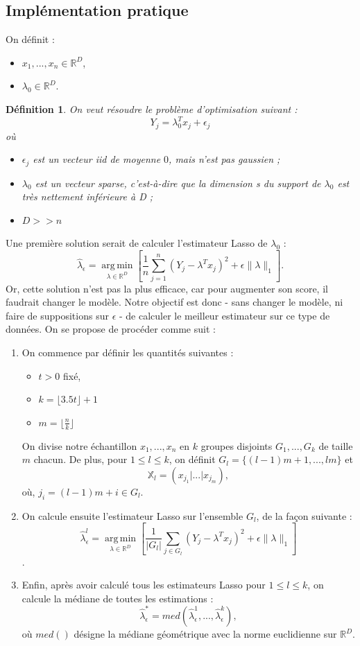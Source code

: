 \documentclass{article}
\DeclareMathOperator*{\argmin}{arg\,min}
\newtheorem{definition}{Définition}
\newcommand{\floor}[1]{\lfloor #1 \rfloor}
\begin{document}
\subsection{Implémentation pratique}
On définit : 
\begin{itemize}
    \item $x_1, ..., x_n \in \mathbb{R}^D$,
    \item $\lambda_0 \in \mathbb{R}^D$.
\end{itemize}
\begin{definition}
On veut résoudre le problème d'optimisation suivant : 
$$Y_j = \lambda_0^T x_j + \epsilon_j$$
où
\begin{itemize}
    \item $\epsilon_j$ est un vecteur iid de moyenne $0$, mais n'est pas gaussien ;
    \item $\lambda_0$ est un vecteur sparse, c'est-à-dire que la dimension s du support de $\lambda_0$ est très nettement inférieure à D ;
    \item $D >> n$
\end{itemize}
\end{definition}
\vspace{0.1cm}
Une première solution serait de calculer l'estimateur Lasso de $\lambda_0$ :
$$\hat{\lambda}_\epsilon = \argmin\limits_{\lambda \in \mathbb{R}^D} \left[ \frac{1}{n} \sum\limits_{j=1}^{n} (Y_j - \lambda^T x_j)^2 + \epsilon \|\lambda\|_1 \right].$$
Or, cette solution n'est pas la plus efficace, car pour augmenter son score, il faudrait changer le modèle. Notre objectif est donc - sans changer le modèle, ni faire de suppositions sur $\epsilon$ - de calculer le meilleur estimateur sur ce type de données. On se propose de procéder comme suit : 
\begin{enumerate}
    \item On commence par définir les quantités suivantes : 
    \begin{itemize}
        \item $t > 0$ fixé, 
        \item $k = \floor{3.5t} + 1$
        \item $m = \floor{\frac{n}{k}}$
    \end{itemize}
    On divise notre échantillon $x_1, ..., x_n$ en $k$ groupes disjoints $G_1, ..., G_k$ de taille $m$ chacun. De plus, pour $1 \leq l \leq k$, on définit $G_l = \{(l-1)m + 1, ..., lm \}$ et 
$$\mathbb{X}_l = (x_{j_1} | ... | x_{j_m}),$$ 
où,  $j_i = (l - 1)m + i \in G_l$.
    \item On calcule ensuite l'estimateur Lasso sur l'ensemble $G_l$, de la façon suivante :
    $$\hat{\lambda}_\epsilon^l = \argmin\limits_{\lambda \in \mathbb{R}^D} \left[ \frac{1}{|G_l|} \sum\limits_{j \in G_l} (Y_j - \lambda^T x_j)^2 + \epsilon \|\lambda\|_1 \right]$$.
    \item Enfin, après avoir calculé tous les estimateurs Lasso pour $1 \leq l \leq k$, on calcule la médiane de toutes les estimations :
    $$\hat{\lambda}_\epsilon^* = med(\hat{\lambda}_\epsilon^1, ..., \hat{\lambda}_\epsilon^k),$$
    où $med()$ désigne la médiane géométrique avec la norme euclidienne sur $\mathbb{R}^D$.
\end{enumerate}
\end{document}
